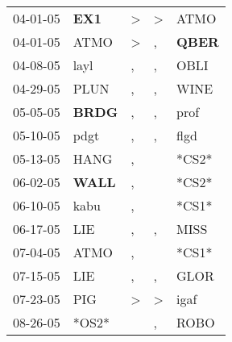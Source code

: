 \begin{supertabular}{p{0.07\textwidth}p{0.06\textwidth}p{0.02\textwidth}p{0.02\textwidth}p{0.06\textwidth}}
          04-01-05\textsuperscript{} &   \textbf{EX1\textsuperscript{}} &     \textgreater &     \textgreater &           ATMO\textsuperscript{} \\
          04-01-05\textsuperscript{} &           ATMO\textsuperscript{} &     \textgreater &                , &  \textbf{QBER\textsuperscript{}} \\
          04-08-05\textsuperscript{} &           layl\textsuperscript{} &                , &                , &           OBLI\textsuperscript{} \\
          04-29-05\textsuperscript{} &           PLUN\textsuperscript{} &                , &                , &           WINE\textsuperscript{} \\
          05-05-05\textsuperscript{} &  \textbf{BRDG\textsuperscript{}} &                , &                , &           prof\textsuperscript{} \\
          05-10-05\textsuperscript{} &           pdgt\textsuperscript{} &                , &                , &           flgd\textsuperscript{} \\
          05-13-05\textsuperscript{} &           HANG\textsuperscript{} &                , &                  &                            *CS2* \\
          06-02-05\textsuperscript{} &  \textbf{WALL\textsuperscript{}} &                , &                  &                            *CS2* \\
          06-10-05\textsuperscript{} &           kabu\textsuperscript{} &                , &                  &                            *CS1* \\
          06-17-05\textsuperscript{} &            LIE\textsuperscript{} &                , &                , &           MISS\textsuperscript{} \\
          07-04-05\textsuperscript{} &           ATMO\textsuperscript{} &                , &                  &                            *CS1* \\
          07-15-05\textsuperscript{} &            LIE\textsuperscript{} &                , &                , &           GLOR\textsuperscript{} \\
          07-23-05\textsuperscript{} &            PIG\textsuperscript{} &     \textgreater &     \textgreater &           igaf\textsuperscript{} \\
          08-26-05\textsuperscript{} &                            *OS2* &                  &                , &           ROBO\textsuperscript{} \\

\end{supertabular}
